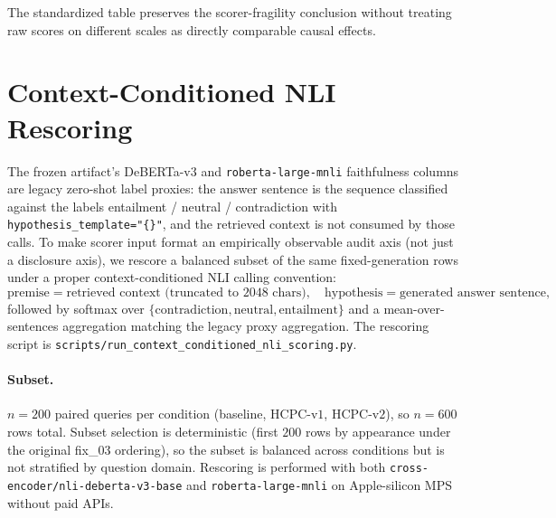 The standardized table preserves the scorer-fragility conclusion
without treating raw scores on different scales as directly comparable
causal effects.

\section{Context-Conditioned NLI Rescoring}
\label{app:context_nli}

The frozen artifact's DeBERTa-v$3$ and \texttt{roberta-large-mnli}
faithfulness columns are legacy zero-shot label proxies: the answer
sentence is the sequence classified against the labels
entailment / neutral / contradiction with
\texttt{hypothesis\_template="\{\}"}, and the retrieved context is
not consumed by those calls. To make scorer input format an
empirically observable audit axis (not just a disclosure axis), we
rescore a balanced subset of the same fixed-generation rows under a
proper context-conditioned NLI calling convention:
\[
\text{premise} = \text{retrieved context (truncated to 2048 chars)},
\quad
\text{hypothesis} = \text{generated answer sentence},
\]
followed by softmax over
$\{\text{contradiction},\text{neutral},\text{entailment}\}$ and a
mean-over-sentences aggregation matching the legacy proxy aggregation.
The rescoring script is \texttt{scripts/run\_context\_conditioned\_nli\_scoring.py}.

\paragraph{Subset.} $n=200$ paired queries per condition (baseline,
HCPC-v$1$, HCPC-v$2$), so $n=600$ rows total. Subset selection is
deterministic (first $200$ rows by appearance under the original
fix\_03 ordering), so the subset is balanced across conditions but is
not stratified by question domain. Rescoring is performed with both
\texttt{cross-encoder/nli-deberta-v3-base} and
\texttt{roberta-large-mnli} on Apple-silicon MPS without paid APIs.

